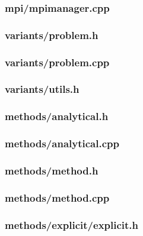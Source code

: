 \documentclass[12pt]{article}
\begin{document}
\subsubsection*{mpi/mpimanager.cpp}


\subsubsection*{variants/problem.h}


\subsubsection*{variants/problem.cpp}


\subsubsection*{variants/utils.h}


\subsubsection*{methods/analytical.h}


\subsubsection*{methods/analytical.cpp}


\subsubsection*{methods/method.h}


\subsubsection*{methods/method.cpp}


\subsubsection*{methods/explicit/explicit.h}

\end{document}
